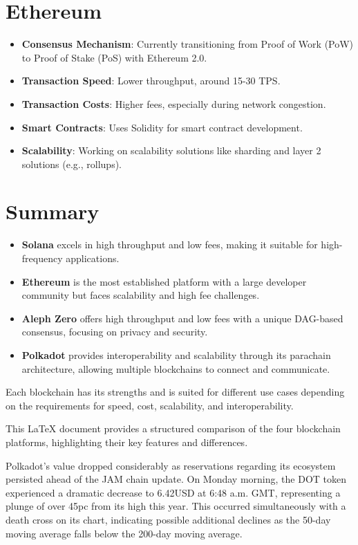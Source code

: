 \documentclass{tufte-handout}
\begin{document}
\section*{Ethereum}
\begin{itemize}
    \item \textbf{Consensus Mechanism}: Currently transitioning from Proof of Work (PoW) to Proof of Stake (PoS) with Ethereum 2.0.
    \item \textbf{Transaction Speed}: Lower throughput, around 15-30 TPS.
    \item \textbf{Transaction Costs}: Higher fees, especially during network congestion.
    \item \textbf{Smart Contracts}: Uses Solidity for smart contract development.
    \item \textbf{Scalability}: Working on scalability solutions like sharding and layer 2 solutions (e.g., rollups).
\end{itemize}

\section*{Summary}
\begin{itemize}
    \item \textbf{Solana} excels in high throughput and low fees, making it suitable for high-frequency applications.
    \item \textbf{Ethereum} is the most established platform with a large developer community but faces scalability and high fee challenges.
    \item \textbf{Aleph Zero} offers high throughput and low fees with a unique DAG-based consensus, focusing on privacy and security.
    \item \textbf{Polkadot} provides interoperability and scalability through its parachain architecture, allowing multiple blockchains to connect and communicate.
\end{itemize}

Each blockchain has its strengths and is suited for different use cases depending on the requirements for speed, cost, scalability, and interoperability.

This LaTeX document provides a structured comparison of the four blockchain platforms, highlighting their key features and differences.

Polkadot's value dropped considerably as reservations regarding its ecosystem persisted ahead of the JAM chain update. On Monday morning, the DOT token experienced a
dramatic decrease to 6.42USD at 6:48 a.m. GMT, representing a plunge of over 45pc from its high this year. This occurred simultaneously with a death cross on its chart,
indicating possible additional declines as the 50-day moving average falls below the 200-day moving average.
\end{document}
